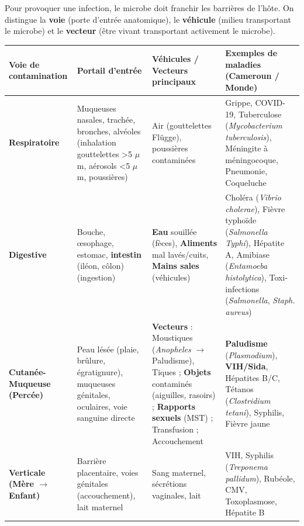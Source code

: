 \documentclass[11pt]{article}
\begin{document}
\begin{definition}
    Pour provoquer une infection, le microbe doit franchir les barrières de l'hôte. On distingue la \textbf{voie} (porte d'entrée anatomique), le \textbf{véhicule} (milieu transportant le microbe) et le \textbf{vecteur} (être vivant transportant activement le microbe).
    \begin{center}
    \begin{tabularx}{\linewidth}{|l|X|X|X|}\hline
    \rowcolor{popblueL}
    \textbf{Voie de contamination} & \textbf{Portail d'entrée} & \textbf{Véhicules / Vecteurs principaux} & \textbf{Exemples de maladies (Cameroun / Monde)} \\ \hline
    \textbf{Respiratoire} & Muqueuses nasales, trachée, bronches, alvéoles (inhalation gouttelettes \textgreater 5 $\mu$m, aérosols \textless 5 $\mu$m, poussières) & Air (gouttelettes Flügge), poussières contaminées & Grippe, COVID-19, Tuberculose (\emph{Mycobacterium tuberculosis}), Méningite à méningocoque, Pneumonie, Coqueluche \\ \hline
    \textbf{Digestive} & Bouche, œsophage, estomac, \textbf{intestin} (iléon, côlon) (ingestion) & \textbf{Eau} souillée (fèces), \textbf{Aliments} mal lavés/cuits, \textbf{Mains sales} (véhicules) & Choléra (\emph{Vibrio cholerae}), Fièvre typhoïde (\emph{Salmonella Typhi}), Hépatite A, Amibiase (\emph{Entamoeba histolytica}), Toxi-infections (\emph{Salmonella}, \emph{Staph. aureus}) \\ \hline
    \textbf{Cutanée-Muqueuse (Percée)} & Peau lésée (plaie, brûlure, égratignure), muqueuses génitales, oculaires, voie sanguine directe & \textbf{Vecteurs} : Moustiques (\emph{Anopheles} $\rightarrow$ Paludisme), Tiques ; \textbf{Objets} contaminés (aiguilles, rasoirs) ; \textbf{Rapports sexuels} (MST) ; Transfusion ; Accouchement & \textbf{Paludisme} (\emph{Plasmodium}), \textbf{VIH/Sida}, Hépatites B/C, Tétanos (\emph{Clostridium tetani}), Syphilis, Fièvre jaune \\ \hline
    \textbf{Verticale (Mère $\rightarrow$ Enfant)} & Barrière placentaire, voies génitales (accouchement), lait maternel & Sang maternel, sécrétions vaginales, lait & VIH, Syphilis (\emph{Treponema pallidum}), Rubéole, CMV, Toxoplasmose, Hépatite B \\ \hline
    \end{tabularx}
    \end{center}
\end{definition}
\end{document}
